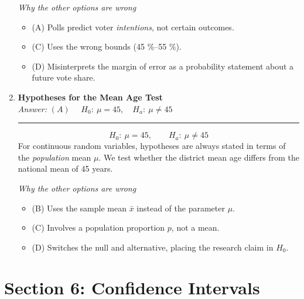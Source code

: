 \documentclass[12pt]{article}
\begin{document}
\begin{enumerate}[label=5.\arabic*]
\smallskip
\emph{Why the other options are wrong}
\begin{itemize}
  \item (A) Polls predict voter \emph{intentions}, not certain outcomes.  
  \item (C) Uses the wrong bounds (45 \%–55 \%).  
  \item (D) Misinterprets the margin of error as a probability statement about a future vote share.
\end{itemize}

\item \textbf{Hypotheses for the Mean Age Test}\\[2pt]

\textit{Answer:}\; $\boxed{(A)} \quad$ $H_0:\ \mu = 45, \quad H_a:\ \mu \neq 45$ \newline \noindent\hspace*{0.01cm}\rule{\linewidth}{0.1pt}
\[
  H_0:\ \mu = 45, 
  \qquad
  H_a:\ \mu \neq 45
\]
For continuous random variables, hypotheses are always stated in terms of the \emph{population} mean \(\mu\).  
We test whether the district mean age differs from the national mean of 45 years.

\smallskip
\emph{Why the other options are wrong}
\begin{itemize}
  \item (B) Uses the sample mean \(\bar{x}\) instead of the parameter \(\mu\).  
  \item (C) Involves a population proportion \(p\), not a mean.  
  \item (D) Switches the null and alternative, placing the research claim in \(H_0\).
\end{itemize}

\end{enumerate}

\section*{Section 6: Confidence Intervals}
\end{document}
